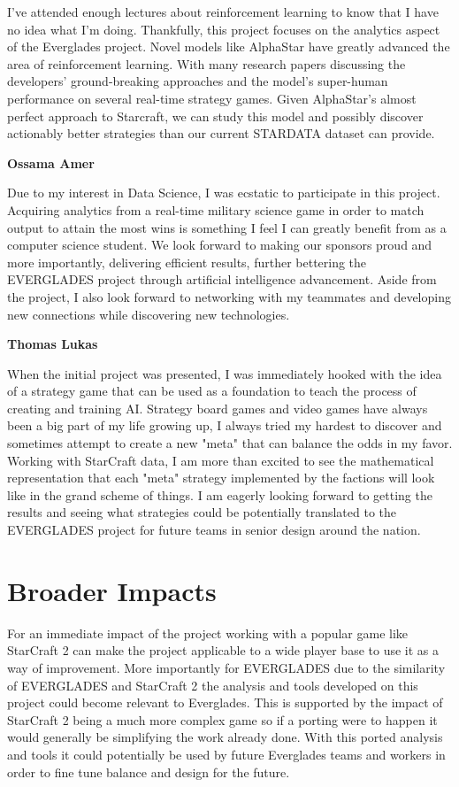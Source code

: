 \documentclass[a4paper,12pt]{report}
\newcommand{\msection}[1]{\noindent\textbf{#1}}
\begin{document}
I’ve attended enough lectures about reinforcement learning to know that I have no idea what I’m doing. Thankfully, this project focuses on the analytics aspect of the Everglades project. Novel models like AlphaStar have greatly advanced the area of reinforcement learning. With many research papers discussing the developers’ ground-breaking approaches and the model’s super-human performance on several real-time strategy games. Given AlphaStar’s almost perfect approach to Starcraft, we can study this model and possibly discover actionably better strategies than our current STARDATA dataset can provide.

\msection{Ossama Amer}

Due to my interest in Data Science, I was ecstatic to participate in this project. Acquiring analytics from a real-time military science game in order to match output to attain the most wins is something I feel I can greatly benefit from as a computer science student. We look forward to making our sponsors proud and more importantly, delivering efficient results, further bettering the EVERGLADES project through artificial intelligence advancement. Aside from the project, I also look forward to networking with my teammates and developing new connections while discovering new technologies.

\msection{Thomas Lukas}

When the initial project was presented, I was immediately hooked with the idea of a strategy game that can be used as a foundation to teach the process of creating and training AI. Strategy board games and video games have always been a big part of my life growing up, I always tried my hardest to discover and sometimes attempt to create a new "meta" that can balance the odds in my favor. Working with StarCraft data, I am more than excited to see the mathematical representation that each "meta" strategy implemented by the factions will look like in the grand scheme of things. I am eagerly looking forward to getting the results and seeing what strategies could be potentially translated to the EVERGLADES project for future teams in senior design around the nation.

\section{Broader Impacts}

For an immediate impact of the project working with a popular game like StarCraft 2 can make the project applicable to a wide player base to use it as a way of improvement. More importantly for EVERGLADES due to the similarity of EVERGLADES and StarCraft 2 the analysis and tools developed on this project could become relevant to Everglades. This is supported by the impact of StarCraft 2 being a much more complex game so if a porting were to happen it would generally be simplifying the work already done. With this ported analysis and tools it could potentially be used by future Everglades teams and workers in order to fine tune balance and design for the future.
\end{document}

